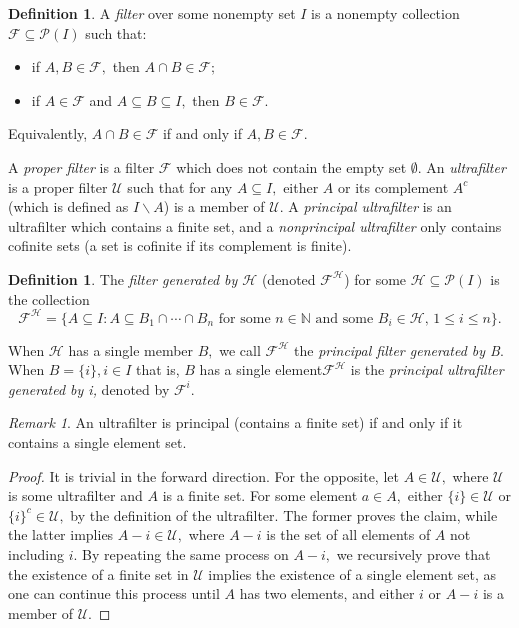 \documentclass[12pt]{amsart}
\newcommand{\NN}{\mathbb{N}}
\newcommand{\mcF}{\mathcal{F}}
\newcommand{\mcH}{\mathcal{H}}
\newcommand{\mcU}{\mathcal{U}}
\theoremstyle{plain}
\theoremstyle{definition}
\newtheorem{defn}[thm]{Definition}
\theoremstyle{remark}
\newtheorem{rem}[thm]{Remark}
\theoremstyle{theorem}
\numberwithin{equation}{section}
\numberwithin{thm}{section}
\begin{document}
\begin{defn}
A \textit{filter} over some nonempty set $I$ is a nonempty collection $\mathcal{F} \subseteq \mathcal{P}(I)$ such that:
\begin{itemize}
    \item if $A,B \in \mathcal{F},$ then $A \cap B \in \mathcal{F};$
    \item if $A \in \mathcal{F}$ and $A \subseteq B \subseteq I,$ then $B \in \mathcal{F}.$
\end{itemize}
Equivalently, $A \cap B \in \mathcal{F}$ if and only if $A,B \in \mcF.$
\end{defn}
A \textit{proper filter} is a filter $\mathcal{F}$ which does not contain the empty set $\emptyset.$ An \textit{ultrafilter} is a proper filter $\mathcal{U}$ such that for any $A \subseteq I,$ either $A$ or its complement $A^c$ (which is defined as $I \backslash A$) is a member of $\mathcal{U}.$ A \textit{principal ultrafilter} is an ultrafilter which contains a finite set, and a \textit{nonprincipal ultrafilter} only contains cofinite sets (a set is cofinite if its complement is finite).

\begin{defn}
The \textit{filter generated by $\mathcal{H}$} (denoted $\mathcal{F}^\mathcal{H}$) for some $\mathcal{H} \subseteq \mathcal{P}(I)$ is the collection
\[\mcF^\mcH = \{A \subseteq I: A\subseteq B_1 \cap \cdots \cap B_n \text{ for some $n \in \NN$ and some $B_i \in \mcH, \, 1 \leq i \leq n$}\}. \]
\end{defn}
When $\mcH$ has a single member $B,$ we call $\mcF^\mcH$ the \textit{principal filter generated by B}. When $B = \{i\}, i \in I$ \textemdash that is, $B$ has a single element\textemdash $\mcF^\mcH$ is the \textit{principal ultrafilter generated by i,} denoted by $\mcF^i.$
\begin{rem}
An ultrafilter is principal (contains a finite set) if and only if it contains a single element set. \label{seg}
\end{rem}
\begin{proof}
It is trivial in the forward direction. For the opposite, let $A \in \mcU,$ where $\mcU$ is some ultrafilter and $A$ is a finite set. For some element $a\in A,$ either $\{i\} \in \mcU$ or $\{i\}^c \in \mcU,$ by the definition of the ultrafilter. The former proves the claim, while the latter implies $A-i \in \mcU,$ where $A-i$ is the set of all elements of $A$ not including $i.$ By repeating the same process on $A-i,$ we recursively prove that the existence of a finite set in $\mcU$ implies the existence of a single element set, as one can continue this process until $A$ has two elements, and either $i$ or $A-i$ is a member of $\mcU$.
\end{proof}
\end{document}
